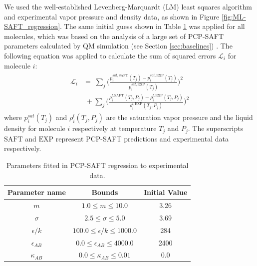 We used the well-established Levenberg-Marquardt (LM) least squares algorithm and experimental vapor pressure and density data, as shown in Figure \ref{fig:ML-SAFT_regression}. The same initial guess shown in Table \ref{tab:regression_params} was applied for all molecules, which was based on the analysis of a large set of PCP-SAFT parameters calculated by QM simulation (see Section \ref{sec:baselines}) \cite{Kaminski2020}. The following equation was applied to calculate the sum of squared errors $\mathcal{L}_i$ for molecule $i$:
\begin{gather}
\begin{aligned}
    \mathcal{L}_i & = \; \sum_j \biggl(\frac{p_{i}^{sat,\text{SAFT}}(T_j) - p_{i}^{sat,\text{EXP}}(T_j)}{ p_{i}^{sat,\text{EXP}}(T_j)}\biggr)^2 \\
    & \; + \sum_j \biggl(\frac{\rho_{i}^{l,\text{SAFT}}(T_j, P_j) - \rho_{i}^{l,\text{EXP}}(T_j, P_j) }{\rho_{i}^{l,\text{EXP}}(T_j, P_j) }\biggr)^2 
\end{aligned}
\end{gather}
where $p_i^{sat}(T_j)$ and $\rho_{i}^{l}(T_j, P_j)$ are the saturation vapor pressure and the liquid density for molecule $i$ respectively at temperature $T_j$ and $P_j$. The superscripts $\text{SAFT}$ and $\text{EXP}$ represent PCP-SAFT predictions and experimental data respectively. 

\begin{table}
    \centering
    \caption{Parameters fitted in PCP-SAFT regression to experimental data.}
    \label{tab:regression_params}
    \begin{tabular}{ccc}
        Parameter name & Bounds & Initial Value \\
        \hline
        $m$ & $1.0 \leq m \leq 10.0$ & 3.26 \\
        $\sigma$ & $2.5 \leq \sigma \leq 5.0$ & 3.69 \\
        $\epsilon/k$ & $100.0 \leq \epsilon/k \leq 1000.0$ & 284 \\
        $\epsilon_{AB}$ & $0.0 \leq \epsilon_{AB} \leq 4000.0$ & 2400 \\
        $\kappa_{AB}$ & $0.0 \leq \kappa_{AB} \leq 0.01$ & 0.0 \\
        \hline
    \end{tabular}
\end{table}


